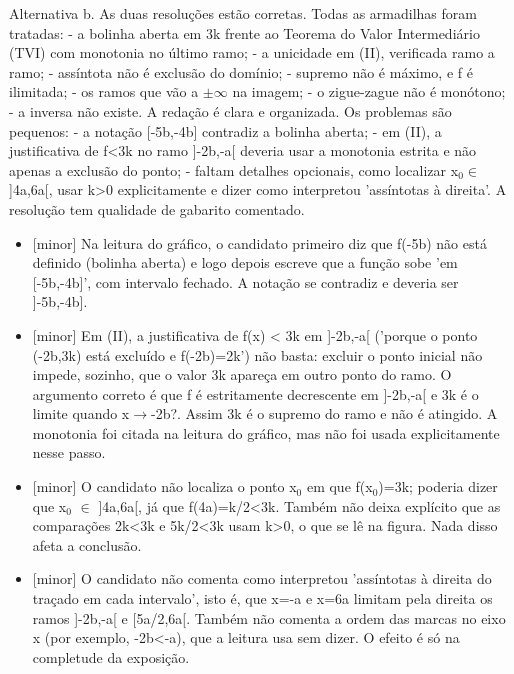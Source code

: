 \documentclass{article}%
\begin{document}
\newline%
Alternativa b. As duas resoluções estão corretas.\newline%
\newline%
Todas as armadilhas foram tratadas:\newline%
{-} a bolinha aberta em 3k frente ao Teorema do Valor Intermediário (TVI) com monotonia no último ramo;\newline%
{-} a unicidade em (II), verificada ramo a ramo;\newline%
{-} assíntota não é exclusão do domínio;\newline%
{-} supremo não é máximo, e f é ilimitada;\newline%
{-} os ramos que vão a $\pm$$\infty$ na imagem;\newline%
{-} o zigue{-}zague não é monótono;\newline%
{-} a inversa não existe.\newline%
\newline%
A redação é clara e organizada. Os problemas são pequenos:\newline%
{-} a notação {[}-5b,-4b{]} contradiz a bolinha aberta;\newline%
{-} em (II), a justificativa de f<3k no ramo {]}-2b,-a{[} deveria usar a monotonia estrita e não apenas a exclusão do ponto;\newline%
{-} faltam detalhes opcionais, como localizar x$_{0}$$\in${]}4a,6a{[}, usar k>0 explicitamente e dizer como interpretou 'assíntotas à direita'.\newline%
\newline%
A resolução tem qualidade de gabarito comentado.%
\begin{itemize}%
\item%
{[}minor{]} Na leitura do gráfico, o candidato primeiro diz que f(-5b) não está definido (bolinha aberta) e logo depois escreve que a função sobe 'em {[}-5b,-4b{]}', com intervalo fechado. A notação se contradiz e deveria ser {]}-5b,-4b{]}.%
\item%
{[}minor{]} Em (II), a justificativa de f(x) < 3k em {]}-2b,-a{[} ('porque o ponto (-2b,3k) está excluído e f(-2b)=2k') não basta: excluir o ponto inicial não impede, sozinho, que o valor 3k apareça em outro ponto do ramo. O argumento correto é que f é estritamente decrescente em {]}-2b,-a{[} e 3k é o limite quando x$\to$-2b?. Assim 3k é o supremo do ramo e não é atingido. A monotonia foi citada na leitura do gráfico, mas não foi usada explicitamente nesse passo.%
\item%
{[}minor{]} O candidato não localiza o ponto x$_{0}$ em que f(x$_{0}$)=3k; poderia dizer que x$_{0}$ $\in$ {]}4a,6a{[}, já que f(4a)=k/2<3k. Também não deixa explícito que as comparações 2k<3k e 5k/2<3k usam k>0, o que se lê na figura. Nada disso afeta a conclusão.%
\item%
{[}minor{]} O candidato não comenta como interpretou 'assíntotas à direita do traçado em cada intervalo', isto é, que x=-a e x=6a limitam pela direita os ramos {]}-2b,-a{[} e {[}5a/2,6a{[}. Também não comenta a ordem das marcas no eixo x (por exemplo, -2b<-a), que a leitura usa sem dizer. O efeito é só na completude da exposição.%
\end{itemize}%
\end{document}
